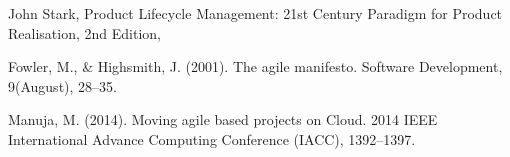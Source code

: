 \documentclass[runningheads,a4paper]{llncs}
\begin{document}
\begin{thebibliography}{9}
 John Stark, Product Lifecycle Management: 21st Century Paradigm for Product Realisation, 2nd Edition,
 
 Fowler, M., \& Highsmith, J. (2001). The agile manifesto. Software Development, 9(August), 28–35. 

Manuja, M. (2014). Moving agile based projects on Cloud. 2014 IEEE International Advance Computing Conference (IACC), 1392–1397. 

\end{thebibliography}



\end{document}
